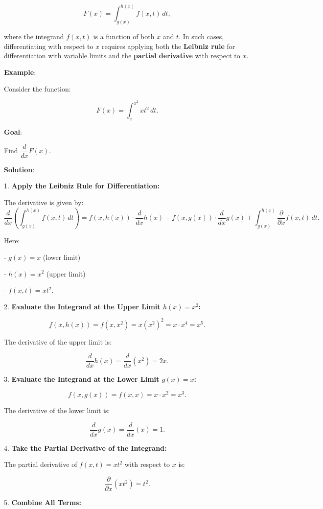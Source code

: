 \documentclass[a4paper,12pt]{book}
\begin{document}
\[
F(x) = \int_{g(x)}^{h(x)} f(x, t) \, dt,
\]

where the integrand \(f(x, t)\) is a function of both \(x\) and \(t\). In such cases, differentiating with respect to \(x\) requires applying both the \textbf{Leibniz rule} for differentiation with variable limits and the \textbf{partial derivative} with respect to \(x\).

\textbf{Example}:

Consider the function:

\[
F(x) = \int_{x}^{x^2} x t^2 \, dt.
\]

\textbf{Goal}:

Find \(\dfrac{d}{dx} F(x)\).

\textbf{Solution}:

1. \textbf{Apply the Leibniz Rule for Differentiation:}

   The derivative is given by:
   \[
   \dfrac{d}{dx} \left( \int_{g(x)}^{h(x)} f(x, t) \, dt \right) = f(x, h(x)) \cdot \dfrac{d}{dx}h(x) - f(x, g(x)) \cdot \dfrac{d}{dx}g(x) + \int_{g(x)}^{h(x)} \dfrac{\partial}{\partial x} f(x, t) \, dt.
   \]

   Here:

- \(g(x) = x\) (lower limit)

- \(h(x) = x^2\) (upper limit)

- \(f(x, t) = xt^2\).

2. \textbf{Evaluate the Integrand at the Upper Limit \(h(x) = x^2\):}

   \[
   f(x, h(x)) = f(x, x^2) = x(x^2)^2 = x \cdot x^4 = x^5.
   \]

   The derivative of the upper limit is:

   \[
   \dfrac{d}{dx} h(x) = \dfrac{d}{dx}(x^2) = 2x.
   \]

3. \textbf{Evaluate the Integrand at the Lower Limit \(g(x) = x\):}

   \[
   f(x, g(x)) = f(x, x) = x \cdot x^2 = x^3.
   \]

   The derivative of the lower limit is:

   \[
   \dfrac{d}{dx} g(x) = \dfrac{d}{dx}(x) = 1.
   \]

4. \textbf{Take the Partial Derivative of the Integrand:}

   The partial derivative of \(f(x, t) = xt^2\) with respect to \(x\) is:

   \[
   \dfrac{\partial}{\partial x}(xt^2) = t^2.
   \]

5. \textbf{Combine All Terms:}
\end{document}
